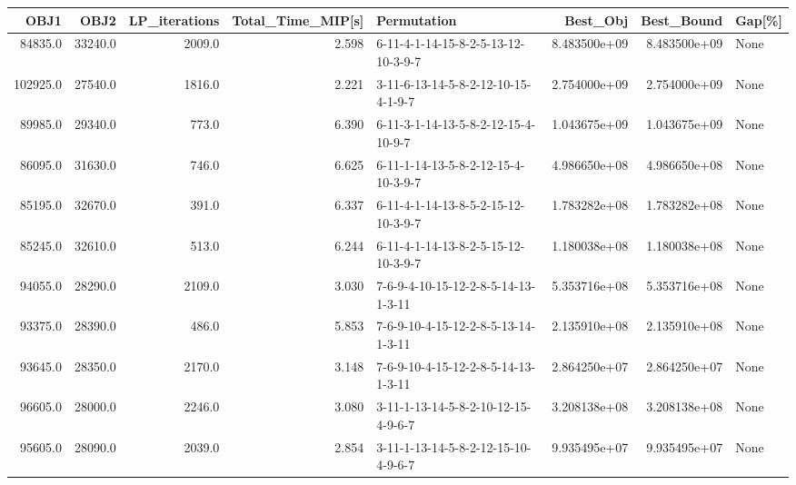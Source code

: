 \begin{tabular}{rrrrlrrl}
\toprule
     OBJ1 &     OBJ2 &  LP\_iterations &  Total\_Time\_MIP[s] &                          Permutation &      Best\_Obj &    Best\_Bound & Gap[\%] \\
\midrule
  84835.0 &  33240.0 &         2009.0 &              2.598 &  6-11-4-1-14-15-8-2-5-13-12-10-3-9-7 &  8.483500e+09 &  8.483500e+09 &   None \\
 102925.0 &  27540.0 &         1816.0 &              2.221 &  3-11-6-13-14-5-8-2-12-10-15-4-1-9-7 &  2.754000e+09 &  2.754000e+09 &   None \\
  89985.0 &  29340.0 &          773.0 &              6.390 &  6-11-3-1-14-13-5-8-2-12-15-4-10-9-7 &  1.043675e+09 &  1.043675e+09 &   None \\
  86095.0 &  31630.0 &          746.0 &              6.625 &  6-11-1-14-13-5-8-2-12-15-4-10-3-9-7 &  4.986650e+08 &  4.986650e+08 &   None \\
  85195.0 &  32670.0 &          391.0 &              6.337 &  6-11-4-1-14-13-8-5-2-15-12-10-3-9-7 &  1.783282e+08 &  1.783282e+08 &   None \\
  85245.0 &  32610.0 &          513.0 &              6.244 &  6-11-4-1-14-13-8-2-5-15-12-10-3-9-7 &  1.180038e+08 &  1.180038e+08 &   None \\
  94055.0 &  28290.0 &         2109.0 &              3.030 &  7-6-9-4-10-15-12-2-8-5-14-13-1-3-11 &  5.353716e+08 &  5.353716e+08 &   None \\
  93375.0 &  28390.0 &          486.0 &              5.853 &  7-6-9-10-4-15-12-2-8-5-13-14-1-3-11 &  2.135910e+08 &  2.135910e+08 &   None \\
  93645.0 &  28350.0 &         2170.0 &              3.148 &  7-6-9-10-4-15-12-2-8-5-14-13-1-3-11 &  2.864250e+07 &  2.864250e+07 &   None \\
  96605.0 &  28000.0 &         2246.0 &              3.080 &  3-11-1-13-14-5-8-2-10-12-15-4-9-6-7 &  3.208138e+08 &  3.208138e+08 &   None \\
  95605.0 &  28090.0 &         2039.0 &              2.854 &  3-11-1-13-14-5-8-2-12-15-10-4-9-6-7 &  9.935495e+07 &  9.935495e+07 &   None \\
\bottomrule
\end{tabular}
